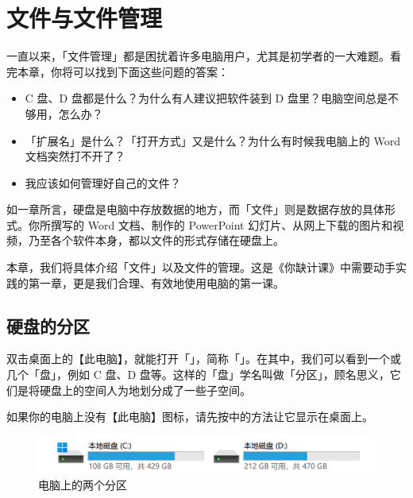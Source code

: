 \chapter{文件与文件管理}
\label{cha:file-and-file-management}

\begin{intro}
  一直以来，「文件管理」都是困扰着许多电脑用户，尤其是初学者的一大难题。看完本章，你将可以找到下面这些问题的答案：
  \begin{itemize}
    \item C 盘、D 盘都是什么？为什么有人建议把软件装到 D 盘里？电脑空间总是不够用，怎么办？
    \item 「扩展名」是什么？「打开方式」又是什么？为什么有时候我电脑上的 Word 文档突然打不开了？
    \item 我应该如何管理好自己的文件？
  \end{itemize}
\end{intro}

如一章所言，硬盘是电脑中存放数据的地方，而「文件」则是数据存放的具体形式。你所撰写的 Word 文档、制作的 PowerPoint 幻灯片、从网上下载的图片和视频，乃至各个软件本身，都以文件的形式存储在硬盘上。

本章，我们将具体介绍「文件」以及文件的管理。这是《你缺计课》中需要动手实践的第一章，更是我们合理、有效地使用电脑的第一课。

\section{硬盘的分区}

双击桌面上的【此电脑】，就能打开「」，简称「」。在其中，我们可以看到一个或几个「盘」，例如 C 盘、D 盘等。这样的「盘」学名叫做「分区」，顾名思义，它们是将硬盘上的空间人为地划分成了一些子空间。

\begin{note}
  如果你的电脑上没有【此电脑】图标，请先按中的方法让它显示在桌面上。
\end{note}

\begin{figure}[htb!]
  \centering
  \includegraphics[width=.8\textwidth]{assets/basic/Partitions.png}
  \caption{电脑上的两个分区}
  \label{fig:Partitions1-2}
\end{figure}


